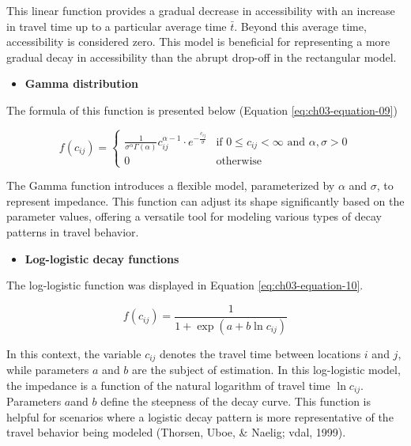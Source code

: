 \documentclass[
11pt, %
oneside, %
english, %
singlespacing, %
]{macthesis} %
\def\tightlist{}
\begin{document}
This linear function provides a gradual decrease in accessibility with an increase in travel time up to a particular average time \(\bar{t}\). Beyond this average time, accessibility is considered zero. This model is beneficial for representing a more gradual decay in accessibility than the abrupt drop-off in the rectangular model.

\begin{itemize}
\tightlist
\item
  \textbf{Gamma distribution}
\end{itemize}

The formula of this function is presented below (Equation \ref{eq:ch03-equation-09})

\begin{equation}
f(c_{ij}) = 
   \begin{cases}
\frac{1}{\sigma^\alpha\Gamma(\alpha)} c_{ij}^{\alpha-1} \cdot e^{-\frac{c_{ij}}{\sigma}} & \text{if } 0 \leq c_{ij} <      \infty  \text{ and } \alpha, \sigma > 0 \\
0 & \text{otherwise}
   \end{cases}
\label{eq:ch03-equation-09}
\end{equation}

The Gamma function introduces a flexible model, parameterized by \(\alpha\) and \(\sigma\), to represent impedance. This function can adjust its shape significantly based on the parameter values, offering a versatile tool for modeling various types of decay patterns in travel behavior.

\begin{itemize}
\tightlist
\item
  \textbf{Log-logistic decay functions}
\end{itemize}

The log-logistic function was displayed in Equation \ref{eq:ch03-equation-10}.

\begin{equation}
f(c_{ij}) = \frac {1}{1+ \exp(a + b\ln c_{ij})}
\label{eq:ch03-equation-10}
\end{equation}

In this context, the variable \(c_{ij}\) denotes the travel time between locations \(i\) and \(j\), while parameters \(a\) and \(b\) are the subject of estimation. In this log-logistic model, the impedance is a function of the natural logarithm of travel time \(\ln c_{ij}\). Parameters \(a\)and \(b\) define the steepness of the decay curve. This function is helpful for scenarios where a logistic decay pattern is more representative of the travel behavior being modeled (Thorsen, Uboe, \& Naelig; vdal, 1999).
\end{document}
